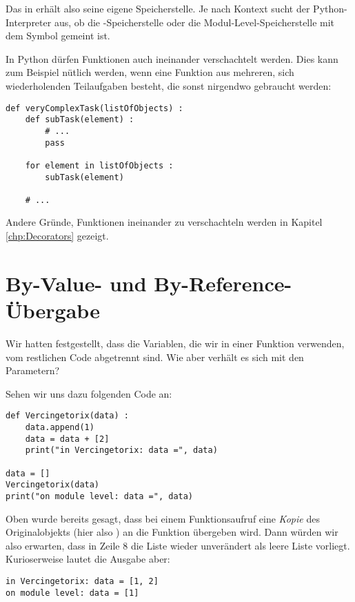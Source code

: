 Das  in  erhält also seine eigene Speicherstelle. Je nach Kontext sucht der Python-Interpreter aus, ob die -Speicherstelle oder die Modul-Level-Speicherstelle mit dem Symbol  gemeint ist.

In Python dürfen Funktionen auch ineinander verschachtelt werden. Dies kann zum Beispiel nütlich werden, wenn eine Funktion aus mehreren, sich wiederholenden Teilaufgaben besteht, die sonst nirgendwo gebraucht werden:

\begin{codebox}
\begin{verbatim}
def veryComplexTask(listOfObjects) :
    def subTask(element) :
        # ...
        pass
    
    for element in listOfObjects :
        subTask(element)
  
    # ...
\end{verbatim}
\end{codebox}

Andere Gründe, Funktionen ineinander zu verschachteln werden in Kapitel \ref{chp:Decorators} gezeigt.

\section{By-Value- und By-Reference-Übergabe}
Wir hatten festgestellt, dass die Variablen, die wir in einer Funktion verwenden, vom restlichen Code abgetrennt sind. Wie aber verhält es sich mit den Parametern?

Sehen wir uns dazu folgenden Code an:
\begin{codebox}
\begin{verbatim}
def Vercingetorix(data) :
    data.append(1)
    data = data + [2]
    print("in Vercingetorix: data =", data)

data = []
Vercingetorix(data)
print("on module level: data =", data)
\end{verbatim}
\end{codebox}
Oben wurde bereits gesagt, dass bei einem Funktionsaufruf eine \emph{Kopie} des Originalobjekts (hier also ) an die Funktion übergeben wird. Dann würden wir also erwarten, dass in Zeile 8 die Liste  wieder unverändert als leere Liste vorliegt. Kurioserweise lautet die Ausgabe aber:

\begin{cmdbox}
\begin{verbatim}
in Vercingetorix: data = [1, 2]
on module level: data = [1]
\end{verbatim}
\end{cmdbox}

